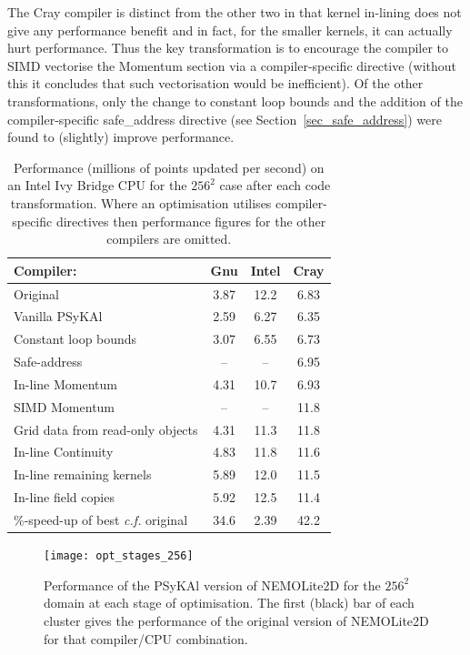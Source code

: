 \documentclass[gmd, manuscript]{copernicus}
\begin{document}
The Cray compiler is distinct from the other two in that kernel
in-lining does not give any performance benefit and in fact, for the
smaller kernels, it can actually hurt performance. Thus the key
transformation is to encourage the compiler to SIMD vectorise the
Momentum section via a compiler-specific directive (without this it
concludes that such vectorisation would be inefficient). Of the other
transformations, only the change to constant loop bounds and the
addition of the compiler-specific safe\_address directive (see
Section~\ref{sec_safe_address}) were found to (slightly) improve
performance.

\begin{table}[!t]
  \caption{Performance (millions of points updated per second) on an Intel
    Ivy Bridge CPU for the
  $256^2$ case after each code transformation. Where an optimisation
  utilises compiler-specific directives then performance figures for
  the other compilers are omitted.}
\label{TABLE_opt_breakdown}
\centering
\begin{tabular}{l|c|c|c}
\hline
Compiler:            & Gnu & Intel & Cray  \\
\hline
Original             & 3.87 & 12.2 & 6.83 \\
Vanilla {PS}y{KA}l   & 2.59 & 6.27 & 6.35 \\
Constant loop bounds & 3.07 & 6.55 & 6.73 \\
Safe-address         & --   & --   & 6.95 \\
In-line Momentum     & 4.31 & 10.7 & 6.93 \\
SIMD Momentum        & --   & --   & 11.8 \\
\parbox{2.5cm}{\raggedright Grid data from read-only objects} & 4.31 & 11.3 & 11.8 \\
In-line Continuity         & 4.83 & 11.8 & 11.6 \\
In-line remaining kernels  & 5.89 & 12.0 & 11.5 \\
In-line field copies       & 5.92 & 12.5 & 11.4 \\
\hline
\parbox{2.5cm}{\raggedright \%-speed-up of best \textit{c.f.} original} & 34.6 & 2.39 & 42.2 \\
\hline
\end{tabular}
\end{table}

\begin{figure}[!t]
\centering
\texttt{[image: opt\_stages\_256]}
\caption{Performance of the {PS}y{KA}l version of NEMOLite2D for the
  $256^{2}$ domain at each stage of optimisation. The first (black)
  bar of each cluster gives the performance of the original version of
  NEMOLite2D for that compiler/CPU combination.}
\label{FIG_opt_stages_256}
\end{figure}
\end{document}
